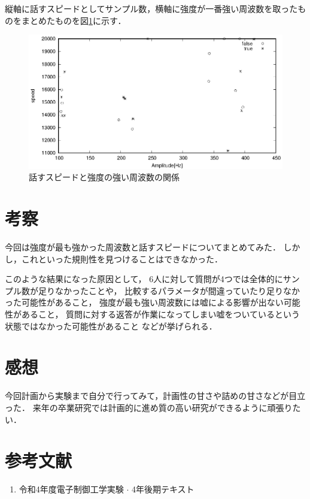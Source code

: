 \documentclass[titlepage]{jarticle}
\begin{document}
縦軸に話すスピードとしてサンプル数，横軸に強度が一番強い周波数を取ったものをまとめたものを図\ref{result}に示す．
\begin{figure}[H]
  \centering
  \includegraphics[width=14cm]{img/result.eps}
  \caption{話すスピードと強度の強い周波数の関係}
  \label{result}
\end{figure}

\section{考察}
今回は強度が最も強かった周波数と話すスピードについてまとめてみた．
しかし，これといった規則性を見つけることはできなかった．

このような結果になった原因として，
6人に対して質問が4つでは全体的にサンプル数が足りなかったことや，
比較するパラメータが間違っていたり足りなかった可能性があること，
強度が最も強い周波数には嘘による影響が出ない可能性があること，
質問に対する返答が作業になってしまい嘘をついているという状態ではなかった可能性があること
などが挙げられる．

\section{感想}
今回計画から実験まで自分で行ってみて，計画性の甘さや詰めの甘さなどが目立った．
来年の卒業研究では計画的に進め質の高い研究ができるように頑張りたい．

\section*{参考文献}
\begin{enumerate}
  \item 令和4年度電子制御工学実験 $\cdot$ 4年後期テキスト
\end{enumerate}
\end{document}
